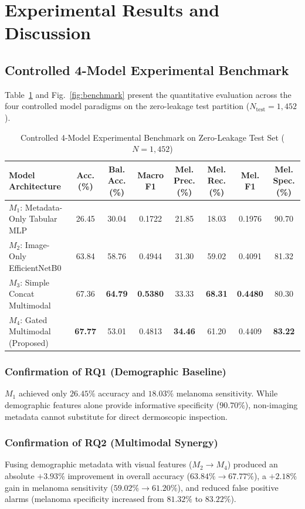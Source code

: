 \documentclass[journal,10pt,twocolumn]{IEEEtran}
\begin{document}
\section{Experimental Results and Discussion}

\subsection{Controlled 4-Model Experimental Benchmark}
Table~\ref{tab:benchmark} and Fig.~\ref{fig:benchmark} present the quantitative evaluation across the four controlled model paradigms on the zero-leakage test partition ($N_{\text{test}} = 1,452$).

\begin{table}[t]
\centering
\caption{Controlled 4-Model Experimental Benchmark on Zero-Leakage Test Set ($N=1,452$)}
\label{tab:benchmark}
\begin{tabular}{lccccccc}
\toprule
\textbf{Model Architecture} & \textbf{Acc. (\%)} & \textbf{Bal. Acc. (\%)} & \textbf{Macro F1} & \textbf{Mel. Prec. (\%)} & \textbf{Mel. Rec. (\%)} & \textbf{Mel. F1} & \textbf{Mel. Spec. (\%)} \\
\midrule
$M_1$: Metadata-Only Tabular MLP      & 26.45 & 30.04 & 0.1722 & 21.85 & 18.03 & 0.1976 & 90.70 \\
$M_2$: Image-Only EfficientNetB0     & 63.84 & 58.76 & 0.4944 & 31.30 & 59.02 & 0.4091 & 81.32 \\
$M_3$: Simple Concat Multimodal      & 67.36 & \textbf{64.79} & \textbf{0.5380} & 33.33 & \textbf{68.31} & \textbf{0.4480} & 80.30 \\
$M_4$: Gated Multimodal (Proposed)   & \textbf{67.77} & 53.01 & 0.4813 & \textbf{34.46} & 61.20 & 0.4409 & \textbf{83.22} \\
\bottomrule
\end{tabular}
\end{table}

\subsubsection{Confirmation of RQ1 (Demographic Baseline)}
$M_1$ achieved only $26.45\%$ accuracy and $18.03\%$ melanoma sensitivity. While demographic features alone provide informative specificity ($90.70\%$), non-imaging metadata cannot substitute for direct dermoscopic inspection.

\subsubsection{Confirmation of RQ2 (Multimodal Synergy)}
Fusing demographic metadata with visual features ($M_2 \to M_4$) produced an absolute $+3.93\%$ improvement in overall accuracy ($63.84\% \to 67.77\%$), a $+2.18\%$ gain in melanoma sensitivity ($59.02\% \to 61.20\%$), and reduced false positive alarms (melanoma specificity increased from $81.32\%$ to $83.22\%$).
\end{document}
